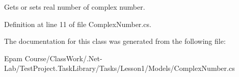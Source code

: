 Gets or sets real number of complex number. 



Definition at line 11 of file Complex\+Number.\+cs.



The documentation for this class was generated from the following file\+:\begin{DoxyCompactItemize}
\item 
Epam Course/\+Class\+Work/.\+Net-\/\+Lab/\+Test\+Project.\+Task\+Library/\+Tasks/\+Lesson1/\+Models/Complex\+Number.\+cs\end{DoxyCompactItemize}
